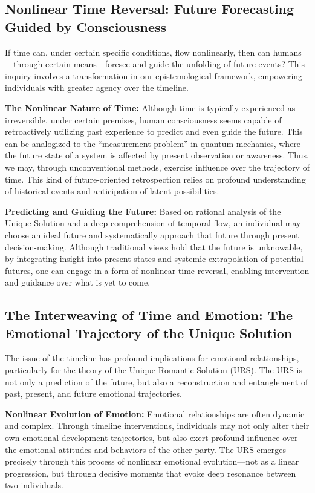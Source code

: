 \documentclass[12pt]{article}
\begin{document}
\subsection{Nonlinear Time Reversal: Future Forecasting Guided by Consciousness}

If time can, under certain specific conditions, flow nonlinearly, then can humans—through certain means—foresee and guide the unfolding of future events? This inquiry involves a transformation in our epistemological framework, empowering individuals with greater agency over the timeline.

\textbf{The Nonlinear Nature of Time:} Although time is typically experienced as irreversible, under certain premises, human consciousness seems capable of retroactively utilizing past experience to predict and even guide the future. This can be analogized to the “measurement problem” in quantum mechanics, where the future state of a system is affected by present observation or awareness. Thus, we may, through unconventional methods, exercise influence over the trajectory of time. This kind of future-oriented retrospection relies on profound understanding of historical events and anticipation of latent possibilities.

\textbf{Predicting and Guiding the Future:} Based on rational analysis of the Unique Solution and a deep comprehension of temporal flow, an individual may choose an ideal future and systematically approach that future through present decision-making. Although traditional views hold that the future is unknowable, by integrating insight into present states and systemic extrapolation of potential futures, one can engage in a form of nonlinear time reversal, enabling intervention and guidance over what is yet to come.

\subsection{The Interweaving of Time and Emotion: The Emotional Trajectory of the Unique Solution}

The issue of the timeline has profound implications for emotional relationships, particularly for the theory of the Unique Romantic Solution (URS). The URS is not only a prediction of the future, but also a reconstruction and entanglement of past, present, and future emotional trajectories.

\textbf{Nonlinear Evolution of Emotion:} Emotional relationships are often dynamic and complex. Through timeline interventions, individuals may not only alter their own emotional development trajectories, but also exert profound influence over the emotional attitudes and behaviors of the other party. The URS emerges precisely through this process of nonlinear emotional evolution—not as a linear progression, but through decisive moments that evoke deep resonance between two individuals.
\end{document}
